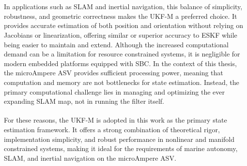 \\ \\
In applications such as SLAM and inertial navigation, this balance of simplicity, robustness, and geometric correctness makes the UKF-M a preferred choice. It provides accurate estimation of both position and orientation without relying on Jacobians or linearization, offering similar or superior accuracy to ESKF while being easier to maintain and extend. Although the increased computational demand can be a limitation for resource constrained systems, it is negligible for modern embedded platforms equipped with SBC. In the context of this thesis, the microAmpere ASV provides sufficient processing power, meaning that computation and memory are not bottlenecks for state estimation. Instead, the primary computational challenge lies in managing and optimizing the ever expanding SLAM map, not in running the filter itself.  
\\ \\
For these reasons, the UKF-M is adopted in this work as the primary state estimation framework. It offers a strong combination of theoretical rigor, implementation simplicity, and robust performance in nonlinear and manifold constrained systems, making it ideal for the requirements of marine autonomy, SLAM, and inertial navigation on the microAmpere ASV.
